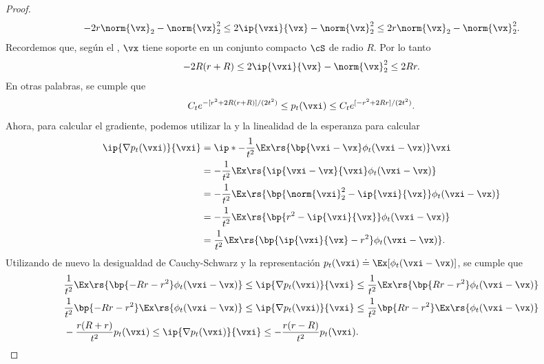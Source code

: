 \documentclass[../../book-main_es.tex]{subfiles}
\begin{document}
\begin{proof}
    \begin{equation}
        -2r\norm{\vx}_{2} - \norm{\vx}_{2}^{2} \leq 2\ip{\vxi}{\vx} -
        \norm{\vx}_{2}^{2} \leq 2r\norm{\vx}_{2} - \norm{\vx}_{2}^{2}.
    \end{equation}
    Recordemos que, según el ,
    \(\vx\) tiene soporte en un conjunto compacto \(\cS\) de radio \(R\). Por lo tanto
    \begin{equation}
        -2R(r + R) \leq 2\ip{\vxi}{\vx} - \norm{\vx}_{2}^{2} \leq 2Rr.
    \end{equation}
    En otras palabras, se cumple que
    \begin{equation}
        C_{t}e^{-[r^{2} + 2R(r + R)]/(2t^{2})} \leq p_{t}(\vxi) \leq
        C_{t}e^{[-r^{2} + 2Rr]/(2t^{2})}.
    \end{equation}
    Ahora, para calcular el gradiente, podemos utilizar la
     y la linealidad de la esperanza para calcular
    \begin{align}
        \ip{\nabla p_{t}(\vxi)}{\vxi}
        &= \ip*{-\frac{1}{t^{2}}\Ex\rs{\bp{\vxi - \vx}\phi_{t}(\vxi -
        \vx)}}{\vxi} \\
        &= -\frac{1}{t^{2}}\Ex\rs{\ip{\vxi - \vx}{\vxi}\phi_{t}(\vxi - \vx)} \\
        &= -\frac{1}{t^{2}}\Ex\rs{\bp{\norm{\vxi}_{2}^{2} -
        \ip{\vxi}{\vx}}\phi_{t}(\vxi - \vx)} \\
        &= -\frac{1}{t^{2}}\Ex\rs{\bp{r^{2} -
        \ip{\vxi}{\vx}}\phi_{t}(\vxi - \vx)} \\
        &= \frac{1}{t^{2}}\Ex\rs{\bp{\ip{\vxi}{\vx} -
        r^{2}}\phi_{t}(\vxi - \vx)}.
    \end{align}
    Utilizando de nuevo la desigualdad de Cauchy-Schwarz y la representación \(p_{t}(\vxi) \doteq
    \Ex[\phi_{t}(\vxi - \vx)]\), se cumple que
    \begin{align}
        &\frac{1}{t^{2}}\Ex\rs{\bp{-Rr - r^{2}}\phi_{t}(\vxi - \vx)}
        \leq \ip{\nabla p_{t}(\vxi)}{\vxi} \leq
        \frac{1}{t^{2}}\Ex\rs{\bp{Rr - r^{2}}\phi_{t}(\vxi - \vx)} \\
        &\frac{1}{t^{2}}\bp{-Rr - r^{2}}\Ex\rs{\phi_{t}(\vxi - \vx)}
        \leq \ip{\nabla p_{t}(\vxi)}{\vxi} \leq \frac{1}{t^{2}}\bp{Rr
        - r^{2}}\Ex\rs{\phi_{t}(\vxi - \vx)} \\
        &-\frac{r(R + r)}{t^{2}}p_{t}(\vxi) \leq \ip{\nabla
        p_{t}(\vxi)}{\vxi} \leq -\frac{r(r - R)}{t^{2}}p_{t}(\vxi).
    \end{align}

\end{proof}
\end{document}
